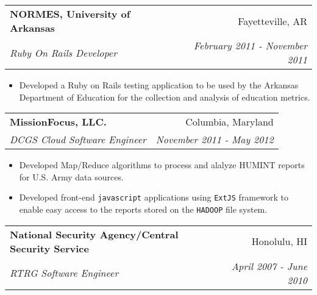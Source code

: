 \documentclass[letterpaper,13pt]{article}
\makeatletter
\newcommand{\resitem}[1]{\item #1 \vspace{-2pt}}
\newcommand{\ressubheading}[4]{

\begin{tabular*}{6.5in}{l@{\cftdotfill{\cftsecdotsep}\extracolsep{\fill}}r}

		\textbf{#1} & #2 \\

		\textit{#3} & \textit{#4} \\

\end{tabular*}\vspace{-4pt}}
\makeatother
\begin{document}
\item

	\ressubheading{NORMES, University of Arkansas}{Fayetteville, AR}{Ruby On Rails Developer}{February 2011 - November 2011}

	\begin{itemize}

		\resitem{Developed a Ruby on Rails testing application to be used by the Arkansas Department of Education for the collection and analysis of education metrics.}

	\end{itemize}
	
\item

	\ressubheading{MissionFocus, LLC.}{Columbia, Maryland}{DCGS Cloud Software Engineer}{November 2011 - May 2012}

	\begin{itemize}

		\resitem{Developed Map/Reduce algorithms to process and alalyze HUMINT reports for U.S. Army data sources.}
		
		\resitem{Developed front-end \texttt{javascript} applications using \texttt{ExtJS} framework to enable easy access to the reports stored on the \texttt{HADOOP} file system.}

	\end{itemize}
	
\item

	\ressubheading{National Security Agency/Central Security Service}{Honolulu, HI}{RTRG Software Engineer}{April 2007 - June 2010}
\end{document}
